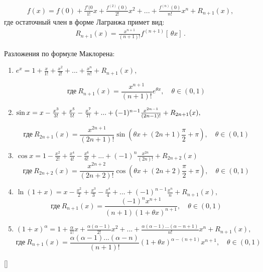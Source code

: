 \begin{align}\label{Makloren}
    f(x) = f(0) + \frac{f'(0}{1!}x + \frac{f^{(2)}(0)}{2!}x^2 + ... + \frac{f^{(n)}(0)}{n!}x^n + R_{n+1}(x),
\end{align}
где остаточный член в форме Лагранжа примет вид:
\begin{align*}
     R_{n+1}(x) = \frac{x^{n+1}}{(n+1)!}f^{(n+1)}[\,\theta x]\,.
\end{align*}

Разложения по формуле Маклорена:
\begin{enumerate}
    \item
        $
            e^x = 1 + \frac{x}{1!} + \frac{x^2}{2!} + ... + \frac{x^n}{n!} + R_{n+1}(x), \
        $
        
        $$
           \text{где} \ R_{n+1}(x) = \frac{x^{n+1}}{(n+1)!}e^{\theta x}, \quad
            \theta \in (0,1)
        $$

    \item
        $
            \sin x = x - \frac{x^3}{3!} + \frac{x^5}{5!} - \frac{x^7}{7!} + ... + (-1)^{n-1}\frac{x^{2n-1}}{(2n-1)!} + R_{2n+1}(x), \\
        $
        
        $$
            \text{где} \ R_{2n+1}(x) = \frac{x^{2n+1}}{(2n+1)!} \sin(\theta x + (2n+1) \frac{\pi}{2} + \pi), \quad \theta \in (0,1)
        $$
    \item 
        $
            \cos x = 1 - \frac{x^2}{2!} + \frac{x^4}{4!} - \frac{x^6}{6!} + ... + (-1)^{n}\frac{x^{2n}}{(2n)!} + R_{2n+2}(x)
        $
        $$
            \text{где} \ R_{2n+2}(x) = \frac{x^{2n+2}}{(2n+2)!} \cos(\theta x + (2n+2) \frac{\pi}{2} + \pi), \quad \theta \in (0,1)
        $$
    \item 
        $
            \ln(1+x) = x - \frac{x^2}{2} + \frac{x^3}{3} - \frac{x^4}{4} + ... + (-1)^{n-1}\frac{x^n}{n} + R_{n+1}(x),
        $
        $$
            \text{где} \ R_{n+1}(x) = \frac{(-1)^n x^{n+1}}{(n+1)(1+\theta x)^{n+1}}, \quad \theta \in (0,1)
        $$
    \item 
        $
            (1+x)^\alpha = 1 + \frac{\alpha}{1!}x + \frac{\alpha (\alpha - 1)}{2!}x^2 + ... + \frac{\alpha(\alpha-1)...(\alpha - n + 1)}{n!}x^n + R_{n+1}(x),
        $
        $$
            \text{где} \ R_{n+1}(x) = \frac{\alpha(\alpha - 1)...(\alpha - n)}{(n+1)!}(1+\theta x)^{\alpha - (n+1)}x^{n+1}, \quad \theta \in (0,1)
        $$
        
    
    
\end{enumerate}
    
[\cite{ilin_poznyak_matan}]